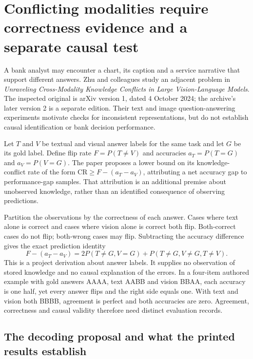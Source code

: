 \section{Conflicting modalities require correctness evidence and a separate causal test}
\label{exec23:conflict-scope}

A bank analyst may encounter a chart, its caption and a service narrative that
support different answers. Zhu and colleagues study an adjacent problem in
\emph{Unraveling Cross-Modality Knowledge Conflicts in Large Vision-Language
Models}. The inspected original is arXiv version 1, dated 4 October 2024;
the archive's later version 2 is a separate edition. Their text and image
question-answering experiments motivate checks for inconsistent representations,
but do not establish causal identification or bank decision performance.
\citep{exec23_cross_modality_conflict}

Let $T$ and $V$ be textual and visual answer labels for the same task and let
$G$ be its gold label. Define flip rate $F=P(T\ne V)$ and accuracies
$a_T=P(T=G)$ and $a_V=P(V=G)$. The paper proposes a lower bound on its
knowledge-conflict rate of the form $\mathrm{CR}\geq F-(a_T-a_V)$, attributing
a net accuracy gap to performance-gap samples. That attribution is an
additional premise about unobserved knowledge, rather than an identified
consequence of observing predictions.\citep{exec23_cross_modality_conflict}

Partition the observations by the correctness of each answer. Cases where
text alone is correct and cases where vision alone is correct both flip.
Both-correct cases do not flip; both-wrong cases may flip. Subtracting the
accuracy difference gives the exact prediction identity
\begin{equation}
 F-(a_T-a_V)=
 2P(T\ne G,V=G)+P(T\ne G,V\ne G,T\ne V).
 \label{exec23:conflict-identity}
\end{equation}
This is a project derivation about answer labels. It supplies no observation
of stored knowledge and no causal explanation of the errors. In a four-item
authored example with gold answers AAAA, text AABB and vision BBAA, each
accuracy is one half, yet every answer flips and the right side equals one.
With text and vision both BBBB, agreement is perfect and both accuracies are
zero. Agreement, correctness and causal validity therefore need distinct
evaluation records.\citep{exec23_context_reference}

\subsection{The decoding proposal and what the printed results establish}
\label{exec23:conflict-decoding}

